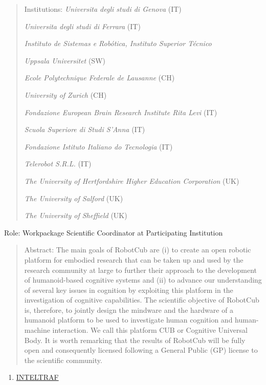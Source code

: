 \documentclass[
]{article}
\begin{document}
\begin{quote}
Institutions: \emph{Universita degli studi di Genova} (IT)

\emph{Universita degli studi di Ferrara} (IT)

\emph{Instituto de Sistemas e Robótica, Instituto Superior Técnico}

\emph{Uppsala Universitet} (SW)

\emph{Ecole Polytechnique Federale de Lausanne} (CH)

\emph{University of Zurich} (CH)

\emph{Fondazione European Brain Research Institute Rita Levi} (IT)

\emph{Scuola Superiore di Studi S'Anna} (IT)

\emph{Fondazione Istituto Italiano do Tecnologia} (IT)

\emph{Telerobot S.R.L.} (IT)

\emph{The University of Hertfordshire Higher Education Corporation} (UK)

\emph{The University of Salford} (UK)

\emph{The University of Sheffield} (UK)
\end{quote}

Role: Workpackage Scientific Coordinator at Participating Institution

\begin{quote}
Abstract: The main goals of RobotCub are (i) to create an open robotic
platform for embodied research that can be taken up and used by the
research community at large to further their approach to the development
of humanoid-based cognitive systems and (ii) to advance our
understanding of several key issues in cognition by exploiting this
platform in the investigation of cognitive capabilities. The scientific
objective of RobotCub is, therefore, to jointly design the mindware and
the hardware of a humanoid platform to be used to investigate human
cognition and human-machine interaction. We call this platform CUB or
Cognitive Universal Body. It is worth remarking that the results of
RobotCub will be fully open and consequently licensed following a
General Public (GP) license to the scientific community.
\end{quote}

\begin{enumerate}
\def\labelenumi{\arabic{enumi}.}
\setcounter{enumi}{15}
\item
  \ul{INTELTRAF}
\end{enumerate}
\end{document}
